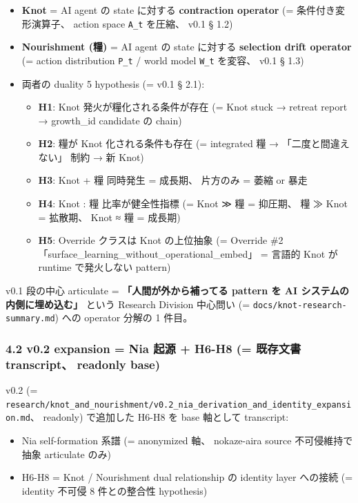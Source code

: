 \documentclass[
]{article}
\providecommand{\tightlist}{%
  \setlength{\itemsep}{0pt}\setlength{\parskip}{0pt}}
\begin{document}
\begin{itemize}
\tightlist
\item
  \textbf{Knot} = AI agent の state に対する \textbf{contraction
  operator} (= 条件付き変形演算子、 action space \texttt{A\_t} を圧縮、
  v0.1 § 1.2)
\item
  \textbf{Nourishment (糧)} = AI agent の state に対する
  \textbf{selection drift operator} (= action distribution \texttt{P\_t}
  / world model \texttt{W\_t} を変容、 v0.1 § 1.3)
\item
  両者の duality 5 hypothesis (= v0.1 § 2.1):

  \begin{itemize}
  \tightlist
  \item
    \textbf{H1}: Knot 発火が糧化される条件が存在 (= Knot stuck → retreat
    report → growth\_id candidate の chain)
  \item
    \textbf{H2}: 糧が Knot 化される条件も存在 (= integrated 糧 →
    「二度と間違えない」 制約 → 新 Knot)
  \item
    \textbf{H3}: Knot + 糧 同時発生 = 成長期、 片方のみ = 萎縮 or 暴走
  \item
    \textbf{H4}: Knot : 糧 比率が健全性指標 (= Knot ≫ 糧 = 抑圧期、 糧 ≫
    Knot = 拡散期、 Knot ≈ 糧 = 成長期)
  \item
    \textbf{H5}: Override クラスは Knot の上位抽象 (= Override \#2
    「surface\_learning\_without\_operational\_embed」 = 言語的 Knot が
    runtime で発火しない pattern)
  \end{itemize}
\end{itemize}

v0.1 段の中心 articulate = \textbf{「人間が外から補ってる pattern を AI
システムの内側に埋め込む」} という Research Division 中心問い (=
\texttt{docs/knot-research-summary.md}) への operator 分解の 1 件目。

\subsubsection{4.2 v0.2 expansion = Nia 起源 + H6-H8 (= 既存文書
transcript、 readonly
base)}\label{v0.2-expansion-nia-ux8d77ux6e90-h6-h8-ux65e2ux5b58ux6587ux66f8-transcript-readonly-base}

v0.2 (=
\texttt{research/knot\_and\_nourishment/v0.2\_nia\_derivation\_and\_identity\_expansion.md}、
readonly) で追加した H6-H8 を base 軸として transcript:

\begin{itemize}
\tightlist
\item
  Nia self-formation 系譜 (= anonymized 軸、 nokaze-aira source
  不可侵維持で抽象 articulate のみ)
\item
  H6-H8 = Knot / Nourishment dual relationship の identity layer
  への接続 (= identity 不可侵 8 件との整合性 hypothesis)
\end{itemize}
\end{document}
